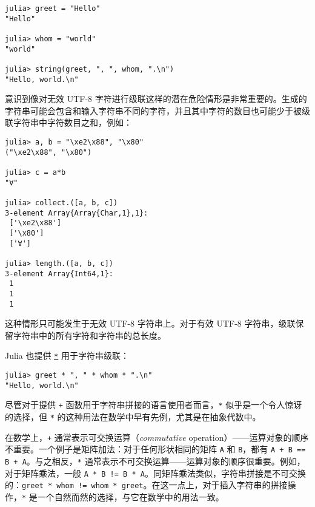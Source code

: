 \begin{verbatim}
julia> greet = "Hello"
"Hello"

julia> whom = "world"
"world"

julia> string(greet, ", ", whom, ".\n")
"Hello, world.\n"
\end{verbatim}



意识到像对无效 UTF-8 字符进行级联这样的潜在危险情形是非常重要的。生成的字符串可能会包含和输入字符串不同的字符，并且其中字符的数目也可能少于被级联字符串中字符数目之和，例如：




\begin{verbatim}
julia> a, b = "\xe2\x88", "\x80"
("\xe2\x88", "\x80")

julia> c = a*b
"∀"

julia> collect.([a, b, c])
3-element Array{Array{Char,1},1}:
 ['\xe2\x88']
 ['\x80']
 ['∀']

julia> length.([a, b, c])
3-element Array{Int64,1}:
 1
 1
 1
\end{verbatim}



这种情形只可能发生于无效 UTF-8 字符串上。对于有效 UTF-8 字符串，级联保留字符串中的所有字符和字符串的总长度。



Julia 也提供 \hyperlink{5498506958944335098}{\texttt{*}} 用于字符串级联：




\begin{verbatim}
julia> greet * ", " * whom * ".\n"
"Hello, world.\n"
\end{verbatim}



尽管对于提供 \texttt{+} 函数用于字符串拼接的语言使用者而言，\texttt{*} 似乎是一个令人惊讶的选择，但 \texttt{*} 的这种用法在数学中早有先例，尤其是在抽象代数中。



在数学上，\texttt{+} 通常表示可交换运算（\emph{commutative} operation）——运算对象的顺序不重要。一个例子是矩阵加法：对于任何形状相同的矩阵 \texttt{A} 和 \texttt{B}，都有 \texttt{A + B == B + A}。与之相反，\texttt{*} 通常表示不可交换运算——运算对象的顺序很重要。例如，对于矩阵乘法，一般 \texttt{A * B != B * A}。同矩阵乘法类似，字符串拼接是不可交换的：\texttt{greet * whom != whom * greet}。在这一点上，对于插入字符串的拼接操作，\texttt{*} 是一个自然而然的选择，与它在数学中的用法一致。



